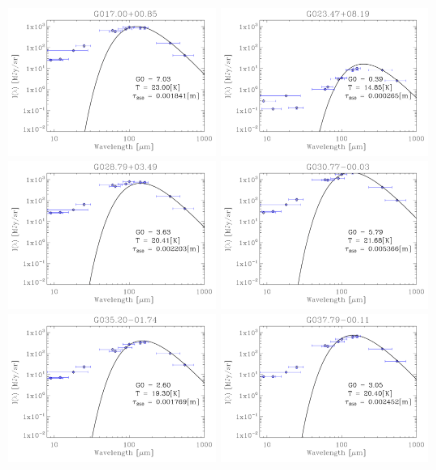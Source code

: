 \begin{figure}
\includegraphics[trim=-1mm -1mm -1mm -1mm, clip, width=55mm]{appB/appB_6.pdf}
\includegraphics[trim=-1mm -1mm -1mm -1mm, clip, width=55mm]{appB/appB_7.pdf}
\includegraphics[trim=-1mm -1mm -1mm -1mm, clip, width=55mm]{appB/appB_8.pdf}
\includegraphics[trim=-1mm -1mm -1mm -1mm, clip, width=55mm]{appB/appB_9.pdf}
\includegraphics[trim=-1mm -1mm -1mm -1mm, clip, width=55mm]{appB/appB_10.pdf}
\includegraphics[trim=-1mm -1mm -1mm -1mm, clip, width=55mm]{appB/appB_11.pdf}

\end{figure}
